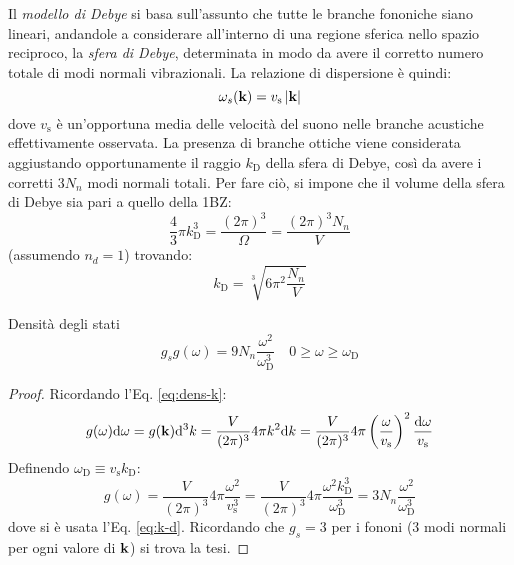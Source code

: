 Il \textit{modello di Debye} si basa sull'assunto che tutte le branche fononiche siano lineari, andandole a considerare all'interno di una regione sferica nello spazio reciproco, la \textit{sfera di Debye}, determinata in modo da avere il corretto numero totale di modi normali vibrazionali. La relazione di dispersione è quindi:
\begin{equation}
	\omega_s(\mathbf{k}) = v_\text{s} \left\lvert\mathbf{k}\right\rvert
\end{equation}
dove $ v_\text{s} $ è un'opportuna media delle velocità del suono nelle branche acustiche effettivamente osservata. La presenza di branche ottiche viene considerata aggiustando opportunamente il raggio $ k_\text{D} $ della sfera di Debye, così da avere i corretti $ 3N_n $ modi normali totali. Per fare ciò, si impone che il volume della sfera di Debye sia pari a quello della 1BZ:
\begin{equation*}
	\frac{4}{3} \pi k_\text{D}^3 = \frac{(2\pi)^3}{\Omega} = \frac{(2\pi)^3 N_n}{V}
\end{equation*}
(assumendo $ n_d = 1 $) trovando:
\begin{equation}
	k_\text{D} = \sqrt[3]{6 \pi^2 \frac{N_n}{V}}
	\label{eq:k-d}
\end{equation}

\begin{proposition}[before upper = {\tcbtitle}]{Densità degli stati}{}
	\begin{equation}
		g_s g(\omega) = 9 N_n \frac{\omega^2}{\omega_\text{D}^3}
		\quad
		0 \ge \omega \ge \omega_\text{D}
	\end{equation}

	\tcblower

	\begin{proof}
		Ricordando l'Eq. \ref{eq:dens-k}:
		\begin{equation*}
			g(\omega) \mathrm{d} \omega = g(\mathbf{k}) \mathrm{d}^3k = \frac{V}{(2\pi)^3} 4\pi k^2 \mathrm{d} k = \frac{V}{(2\pi)^3} 4\pi \left( \frac{\omega}{v_\text{s}} \right)^2 \frac{\mathrm{d} \omega}{v_\text{s}}
		\end{equation*}
		Definendo $ \omega_\text{D} \equiv v_\text{s} k_\text{D} $:
		\begin{equation*}
			g(\omega) = \frac{V}{(2\pi)^3} 4\pi \frac{\omega^2}{v_\text{s}^3} = \frac{V}{(2\pi)^3} 4\pi \frac{\omega^2 k_\text{D}^3}{\omega_\text{D}^3} = 3N_n \frac{\omega^2}{\omega_\text{D}^3}
		\end{equation*}
		dove si è usata l'Eq. \ref{eq:k-d}. Ricordando che $ g_s = 3 $ per i fononi (3 modi normali per ogni valore di $ \mathbf{k} $) si trova la tesi.
	\end{proof}
\end{proposition}

